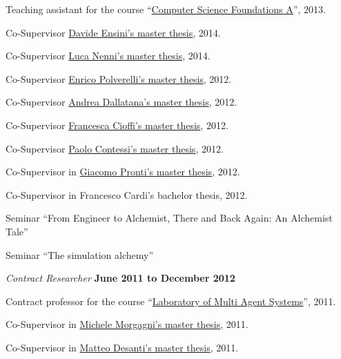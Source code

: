 \documentclass[10pt]{article}
\newenvironment{outerlist}[1][\enskip\textbullet]%
        {\begin{itemize}[#1]}{\end{itemize}%
         \vspace{-.6\baselineskip}}
\newenvironment{innerlist}[1][\enskip\textbullet]%
        {\begin{compactitem}[#1]}{\end{compactitem}}
\newcommand{\halfblankline}{\quad\vspace{-0.5\baselineskip}\pagebreak[3]}
\begin{document}
\begin{outerlist}
\begin{innerlist}
      \item Teaching assistant for the course ``\href{http://www.apice.unibo.it/xwiki/bin/view/Courses/FINFA1213/}{Computer Science Foundations A}'', 2013.
      \item Co-Supervisor \href{http://amslaurea.unibo.it/7990/}{Davide Ensini's master thesis}, 2014.
      \item Co-Supervisor \href{http://amslaurea.unibo.it/6927/}{Luca Nenni's master thesis}, 2014.
      \item Co-Supervisor \href{http://www.apice.unibo.it/xwiki/bin/view/Theses/PolverelliAlchemist2013/}{Enrico Polverelli's master thesis}, 2012.
      \item Co-Supervisor \href{http://apice.unibo.it/xwiki/bin/view/Theses/DallatanaRTSWithBDIAgents/}{Andrea Dallatana's master thesis}, 2012.
      \item Co-Supervisor \href{http://apice.unibo.it/xwiki/bin/view/Theses/adaptivedisplay/}{Francesca Cioffi's master thesis}, 2012.
      \item Co-Supervisor \href{in http://apice.unibo.it/xwiki/bin/view/Theses/semanticwebsapere/}{Paolo Contessi's master thesis}, 2012.
      \item Co-Supervisor in \href{http://www.alice.unibo.it/xwiki/bin/view/Theses/ProntiAlchemistSapere/}{Giacomo Pronti's master thesis}, 2012.
      \item Co-Supervisor in Francesco Cardi's bachelor thesis, 2012.
      \item Seminar ``From Engineer to Alchemist, There and Back Again: An Alchemist Tale''
      \item Seminar ``The simulation alchemy''
    \end{innerlist}
\item[] \textit{Contract Researcher} \hfill \textbf{June 2011 to December 2012}
    \begin{innerlist}
      \item Contract professor for the course ``\href{http://apice.unibo.it/xwiki/bin/view/Courses/SmaLm1112Lab}{Laboratory of Multi Agent Systems}'', 2011.
      \item Co-Supervisor in \href{http://apice.unibo.it/xwiki/bin/view/Theses/SapereComm}{Michele Morgagni's master thesis}, 2011.
      \item Co-Supervisor in \href{http://www.alice.unibo.it/xwiki/bin/view/Theses/LSAspace}{Matteo Desanti's master thesis}, 2011.
    \end{innerlist}
\halfblankline
\end{outerlist}
\end{document}
